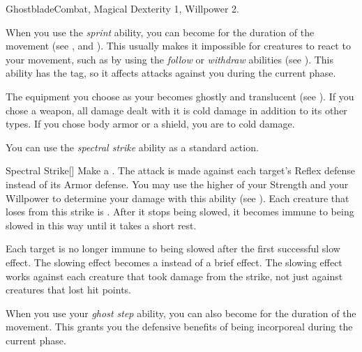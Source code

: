    \begin{feat}{Ghostblade}{Combat, Magical}
        \featpre Dexterity 1, Willpower 2.

         When you use the \textit{sprint} ability, you can become  for the duration of the movement (see , and ).
        This usually makes it impossible for creatures to react to your movement, such as by using the \textit{follow} or \textit{withdraw} abilities (see ).
        This ability has the  tag, so it affects attacks against you during the current phase.

         The equipment you choose as your  becomes ghostly and translucent (see ).
        If you chose a weapon, all damage dealt with it is cold damage in addition to its other types.
        If you chose body armor or a shield, you are  to cold damage.

         You can use the \textit{spectral strike} ability as a standard action.
        \begin{activeability}{Spectral Strike}[]
            \rankline
            Make a .
            The attack is made against each target's Reflex defense instead of its Armor defense.
            You may use the higher of your Strength and your Willpower to determine your damage with this ability (see ).
            Each creature that loses  from this strike is  \slowed.
            After it stops being slowed, it becomes immune to being slowed in this way until it takes a short rest.

            \rankline
             Each target is no longer immune to being slowed after the first successful slow effect.
             The slowing effect becomes a  instead of a brief effect.
             The slowing effect works against each creature that took damage from the strike, not just against creatures that lost hit points.
        \end{activeability}

         When you use your \textit{ghost step} ability, you can also become  for the duration of the movement.
        This grants you the defensive benefits of being incorporeal during the current phase.


\end{feat}
